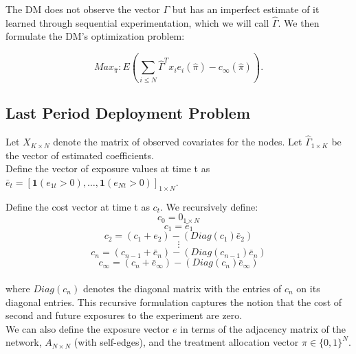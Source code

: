 \documentclass[12pt,a4paper]{article}
\begin{document}
The DM does not observe the vector $\Gamma$ but has an imperfect estimate of it learned through sequential experimentation, which we will call $\hat \Gamma$. We then formulate the DM's optimization problem:

$$Max_{\hat \pi} : E(\sum_{i \leq N} \hat \Gamma^T x_i e_i(\hat \pi) - c_\infty(\hat \pi) ).$$

\iffalse
This ends up being equivalent to this minimization (the equivalence to be clarified later):
%

$$ Min_{\hat \pi} E \left( Sup_\pi \left(\sum_{i \leq N} \Gamma^T x_i e_i(\pi) - c_\infty(\pi) \right) - \sum_{i \leq N} \hat \Gamma^T x_i e_i(\hat \pi) + c_\infty(\hat \pi) \right) $$
%
OR (depending on how $\hat \Gamma \rightarrow \Gamma$).

$$ Min_{\pi} E \left( Sup_\pi \left(\sum_{i \leq N} \Gamma^T x_i e_i(\pi) - c_\infty \right) - \sum_{i \leq N}  \Gamma^T x_i e_i(\pi) + \hat c_\infty \right) $$
\fi

\subsection{Last Period Deployment Problem}

Let $X_{K \times N}$ denote the matrix of observed covariates for the nodes. Let $\hat \Gamma _{1 \times K}$ be the vector of estimated coefficients.\\

Define the vector of exposure values at time t as $\bar e_t=[\mathbf{1}(e_{1t}>0), \dots, \mathbf{1}(e_{Nt}>0)]_{1 \times N}$. 

Define the cost vector at time t as $c_t$.  We recursively define:\\

$$c_0 = 0_{1 \times N}$$
$$c_1 = \bar e_1$$
$$c_2 = (c_1 + e_2) - (Diag(c_1)  \bar e_2)$$
$$\vdots$$
$$c_n = (c_{n-1} + \bar e_n) - (Diag(c_{n-1})  \bar e_n)$$
$$c_\infty = (c_{n} + \bar e_\infty) - (Diag(c_{n})  \bar e_\infty)$$\\

where $Diag(c_n)$ denotes the diagonal matrix with the entries of $c_n$ on its diagonal entries. This recursive formulation captures the notion that the cost of second and future exposures to the experiment are zero.\\

We can also define the exposure vector $e$ in terms of the adjacency matrix of the network, $A_{N \times N}$ (with self-edges), and the treatment allocation vector $\pi \in \{0,1\}^N$.\\
\end{document}
